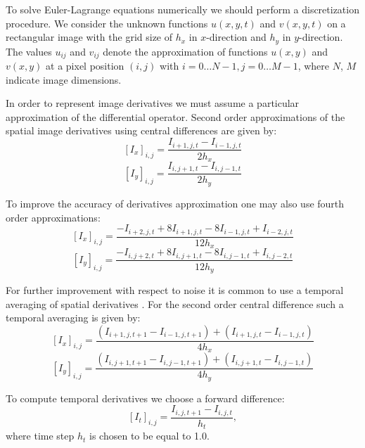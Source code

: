 To solve Euler-Lagrange equations numerically we should perform a discretization procedure. We consider the unknown functions $u(x,y,t)$ and $v(x,y,t)$ on a rectangular image with the grid size of $h_x$ in $x$-direction and $h_y$ in $y$-direction. The values $u_{ij}$ and $v_{ij}$ denote the approximation of functions $u(x,y)$ and $v(x,y)$ at a pixel position $(i,j)$ with $i = 0 \ldots N-1, j=0 \ldots M-1$, where $N$, $M$ indicate image dimensions. 

In order to represent image derivatives we must assume a particular approximation of the differential operator. 
Second order approximations of the spatial image derivatives using central differences are given by:
$$ \left[ I_x \right]_{i,j} = \frac{I_{i+1,j,t} - I_{i-1,j,t} }{2 h_x} $$
$$ \left[ I_y \right]_{i,j} = \frac{I_{i,j+1,t} - I_{i,j-1,t} }{2 h_y} $$

To improve the accuracy of derivatives approximation one may also use fourth order approximations:
$$ \left[ I_x \right]_{i,j} = \frac{-I_{i+2,j,t} +  8  I_{i+1,j,t} - 8 I_{i-1,j,t} + I_{i-2,j,t} }{12 h_x} $$
$$ \left[ I_y \right]_{i,j} = \frac{-I_{i,j+2,t} +  8  I_{i,j+1,t} - 8 I_{i,j-1,t} + I_{i,j-2,t} }{12 h_y} $$

For further improvement with respect to noise it is common to use a temporal averaging of spatial derivatives \cite{Sun10, HarmonyFlow}.
For the second order central difference such a temporal averaging is given by:
$$ \left[ I_x \right]_{i,j} = \frac{(I_{i+1,j,t+1} - I_{i-1,j,t+1}) + (I_{i+1,j,t} - I_{i-1,j,t})  }{4 h_x} $$
$$ \left[ I_y \right]_{i,j} = \frac{(I_{i,j+1,t+1} - I_{i,j-1,t+1}) + (I_{i,j+1,t} - I_{i,j-1,t}) }{4 h_y} $$


To compute temporal derivatives we choose a forward difference:
$$ \left[ I_t \right]_{i,j} = \frac{I_{i,j,t+1} - I_{i,j,t}}{h_t},$$
where time step $h_t$ is chosen to be equal to 1.0.

